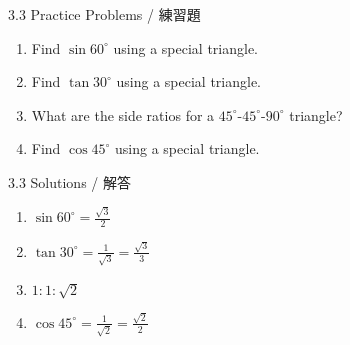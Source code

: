 \documentclass[aspectratio=169]{beamer}
\begin{document}
\begin{frame}{3.3 Practice Problems / 練習題}
    \begin{tcolorbox}[colback=lightgray,colframe=accent,title=Practice]
        \footnotesize
        \begin{enumerate}
            \item Find $\sin 60^\circ$ using a special triangle.
            \item Find $\tan 30^\circ$ using a special triangle.
            \item What are the side ratios for a $45^\circ$-$45^\circ$-$90^\circ$ triangle?
            \item Find $\cos 45^\circ$ using a special triangle.
        \end{enumerate}
    \end{tcolorbox}
\end{frame}

\begin{frame}{3.3 Solutions / 解答}
    \begin{tcolorbox}[colback=lightgray,colframe=accent,title=Solutions]
        \footnotesize
        \begin{enumerate}
            \item $\sin 60^\circ = \frac{\sqrt{3}}{2}$
            \item $\tan 30^\circ = \frac{1}{\sqrt{3}} = \frac{\sqrt{3}}{3}$
            \item $1:1:\sqrt{2}$
            \item $\cos 45^\circ = \frac{1}{\sqrt{2}} = \frac{\sqrt{2}}{2}$
        \end{enumerate}
    \end{tcolorbox}
\end{frame}
\end{document}
